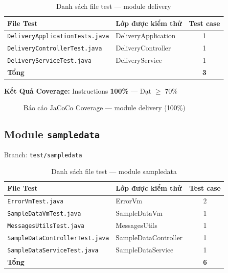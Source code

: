 \begin{table}[H]
\centering
\caption{Danh sách file test --- module delivery}
\begin{tabular}{|l|l|c|}
\hline
\textbf{File Test} & \textbf{Lớp được kiểm thử} & \textbf{Test case} \\
\hline
\texttt{DeliveryApplicationTests.java} & DeliveryApplication & 1 \\
\hline
\texttt{DeliveryControllerTest.java} & DeliveryController & 1 \\
\hline
\texttt{DeliveryServiceTest.java} & DeliveryService & 1 \\
\hline
\textbf{Tổng} & & \textbf{3} \\
\hline
\end{tabular}
\end{table}

\textbf{Kết Quả Coverage:} Instructions \textbf{100\%} --- Đạt $\geq$ 70\%

\begin{figure}[H]
\centering
{}
\caption{Báo cáo JaCoCo Coverage --- module delivery (100\%)}
\end{figure}

\subsection{Module \texttt{sampledata}}

Branch: \texttt{test/sampledata}

\begin{table}[H]
\centering
\caption{Danh sách file test --- module sampledata}
\begin{tabular}{|l|l|c|}
\hline
\textbf{File Test} & \textbf{Lớp được kiểm thử} & \textbf{Test case} \\
\hline
\texttt{ErrorVmTest.java} & ErrorVm & 2 \\
\hline
\texttt{SampleDataVmTest.java} & SampleDataVm & 1 \\
\hline
\texttt{MessagesUtilsTest.java} & MessagesUtils & 1 \\
\hline
\texttt{SampleDataControllerTest.java} & SampleDataController & 1 \\
\hline
\texttt{SampleDataServiceTest.java} & SampleDataService & 1 \\
\hline
\textbf{Tổng} & & \textbf{6} \\
\hline
\end{tabular}
\end{table}


